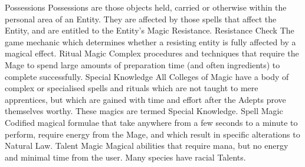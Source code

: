 \documentclass[a4paper]{article}
\begin{document}
\begin{multicols}{3}
Possessions Possessions are those objects held,
carried or otherwise within the personal area of an
Entity. They are affected by those spells that affect
the Entity, and are entitled to the Entity’s Magic
Resistance.
Resistance Check The game mechanic which
determines whether a resisting entity is fully affected by a magical effect.
Ritual Magic Complex procedures and techniques
that require the Mage to spend large amounts of
preparation time (and often ingredients) to complete successfully.
Special Knowledge All Colleges of Magic have a
body of complex or specialised spells and rituals
which are not taught to mere apprentices, but
which are gained with time and effort after the
Adepts prove themselves worthy. These magics are
termed Special Knowledge.
Spell Magic Codified magical formulae that take
anywhere from a few seconds to a minute to perform, require energy from the Mage, and which
result in specific alterations to Natural Law.
Talent Magic Magical abilities that require mana,
but no energy and minimal time from the user.
Many species have racial Talents.


\end{multicols}
\end{document}
